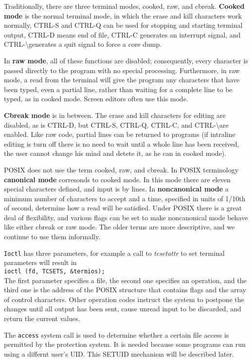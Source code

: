 \documentclass{book}
\newcommand {\kw}  [1] {\textbf{#1}}
\newcommand {\sys} [1] {\textsl{#1}}
\newcommand {\cmd} [1] {\texttt{#1}}
\begin{document}
Traditionally, there are three terminal modes, cooked, raw, and cbreak.
\kw{Cooked mode} is the normal terminal mode, in which the erase and kill characters work normally, 
CTRL-S and CTRL-Q can be used for stopping and starting terminal output, 
CTRL-D means end of file, 
CTRL-C generates an interrupt signal, and 
CTRL-\textbackslash generates a quit signal to force a core dump.
 
In \kw{raw mode}, all of these functions are disabled; consequently, every character is passed directly to the program with no special processing.
Furthermore, in raw mode, a read from the terminal will give the program any characters that have been typed, 
even a partial line, rather than waiting for a complete line to be typed, as in cooked mode.
Screen editors often use this mode.

\kw{Cbreak mode} is in between.
The erase and kill characters for editing are disabled, as is CTRL-D, but CTRL-S, CTRL-Q, CTRL-C, and CTRL-\textbackslash are enabled.
Like raw code, partial lines can be returned to programs (if intraline editing is turn off there is no need 
to wait until a whole line has been received, the user cannot change his mind and detete it, as he can in cooked mode). 

POSIX does not use the term cooked, raw, and cbreak.
In POSIX terminology \kw{canonical mode} corresonds to cooked mode.
In this mode there are eleven special characters defined, and input is by lines.
In \kw{noncanonical mode} a minimum number of characters to accept and a time, specified in units of 1/10th of second, 
determine how a read will be satisfied.
Under POSIX there is a great deal of flexibility, and various flags can be set to make noncanonical mode behave like either cbreak or raw mode.
The older terms are more descriptive, and we continue to use them informally.

\cmd{Ioctl} has three parameters, for example a call to \sys{tcsetattr} to set terminal parameters will result in\\
\cmd{ioctl (fd, TCSETS, \&termios);}\\
The first parameter specifies a file, the second one specifies an operation, 
and the third one is the address of the POSIX structure that contains flags and the array of control characters.
Other operation codes instruct the system to postpone the changes until all output has been sent,
cause unread input to be discarded, and return the current values.

The \cmd{access} system call is used to determine whether a certain file access is permitted by the protection system.
It is needed because some programs can run using a differnt user's UID.
This SETUID mechanism will be described later.
\end{document}
